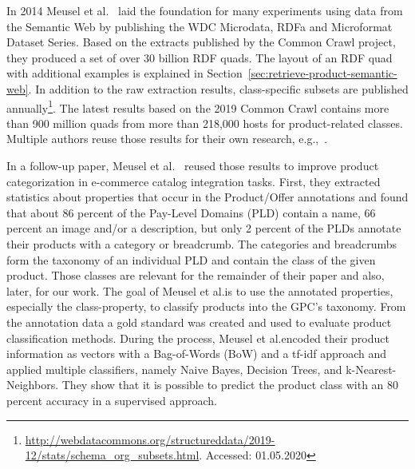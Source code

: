 In 2014 Meusel et al.\@~\cite{meusel2014webdatacommons} laid the foundation for many experiments using data from the
Semantic Web by publishing the WDC Microdata, RDFa and Microformat Dataset Series.
Based on the extracts published by the Common Crawl project, they produced
a set of over 30 billion RDF quads.
The layout of an RDF quad with additional examples is explained in Section~\ref{sec:retrieve-product-semantic-web}.
In addition to the raw extraction results, class-specific subsets are published
annually\footnote{\url{http://webdatacommons.org/structureddata/2019-12/stats/schema_org_subsets.html}. Accessed: 01.05.2020}.
The latest results based on the 2019 Common Crawl contains more than 900 million quads from more than 218,000 hosts
for product-related classes.
Multiple authors reuse those results for their own research, e.g.,~\cite{meusel2015exploiting, petrovski2016wdc, zhang2019product}.

In a follow-up paper, Meusel et al.\@~\cite{meusel2015exploiting} reused those results to improve product categorization
in e-commerce catalog integration tasks.
First, they extracted statistics about properties that occur in the Product/Offer annotations and found that about 86 percent
of the Pay-Level Domains (PLD) contain a name, 66 percent an image and/or a description, but only 2 percent of the PLDs annotate their products
with a category or breadcrumb.
The categories and breadcrumbs form the taxonomy of an individual PLD and contain the class of the given product.
Those classes are relevant for the remainder of their paper and also, later, for our work.
The goal of Meusel et al.\@ is to use the annotated properties, especially the class-property, to classify products into the
GPC's taxonomy.
From the annotation data a gold standard was created and used to evaluate product classification methods.
During the process, Meusel et al.\@ encoded their product information as vectors with a Bag-of-Words (BoW) and a
tf-idf approach and applied multiple classifiers, namely Naive Bayes, Decision Trees, and k-Nearest-Neighbors.
They show that it is possible to predict the product class with an 80 percent accuracy in a supervised approach.

